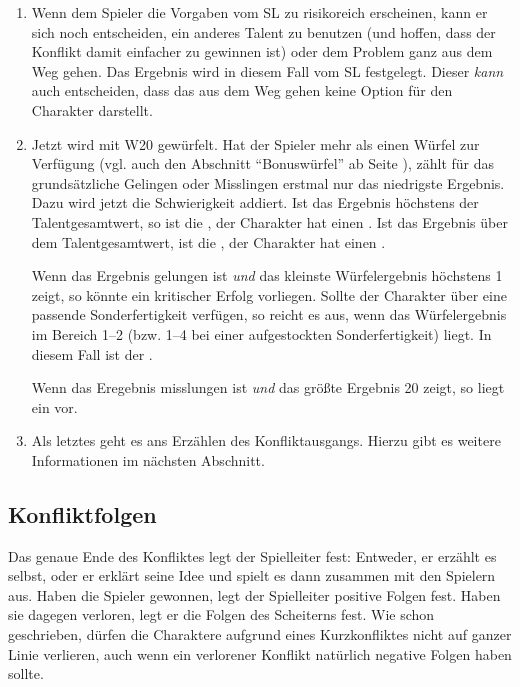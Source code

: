 \begin{enumerate}
  \item Wenn dem Spieler die Vorgaben vom SL zu risikoreich erscheinen, kann er sich noch entscheiden, ein anderes Talent zu benutzen (und hoffen, dass der Konflikt damit einfacher zu gewinnen ist) oder dem Problem ganz aus dem Weg gehen. Das Ergebnis wird in diesem Fall vom SL festgelegt. Dieser \emph{kann} auch entscheiden, dass das aus dem Weg gehen keine Option für den Charakter darstellt.
  
  \item\label{KKAbschnittWuerfeln} Jetzt wird mit W20 gewürfelt. Hat der Spieler mehr als einen Würfel zur Verfügung {(vgl. auch den Abschnitt ``Bonuswürfel'' ab Seite \pageref{Bonuswuerfel})}, zählt für das grundsätzliche Gelingen oder Misslingen erstmal nur das niedrigste Ergebnis. Dazu wird jetzt die Schwierigkeit addiert. Ist das Ergebnis höchstens der Talentgesamtwert, so ist die , der Charakter hat einen . Ist das Ergebnis über dem Talentgesamtwert, ist die , der Charakter hat einen .
  
  Wenn das Ergebnis gelungen ist \emph{und} das kleinste Würfelergebnis höchstens 1 zeigt, so könnte ein kritischer Erfolg vorliegen. Sollte der Charakter über eine passende Sonderfertigkeit verfügen, so reicht es aus, wenn das Würfelergebnis im Bereich 1--2 (bzw. 1--4 bei einer aufgestockten Sonderfertigkeit) liegt. In diesem Fall ist der .

  Wenn das Eregebnis misslungen ist \emph{und} das größte Ergebnis 20 zeigt, so liegt ein  vor.

  \item Als letztes geht es ans Erzählen des Konfliktausgangs. Hierzu gibt es weitere Informationen im nächsten Abschnitt.
\end{enumerate}

\subsection{Konfliktfolgen}
 Das genaue Ende des Konfliktes legt der Spielleiter fest: Entweder, er erzählt es selbst, oder er erklärt seine Idee und spielt es dann zusammen mit den Spielern aus. Haben die Spieler gewonnen, legt der Spielleiter positive Folgen fest. Haben sie dagegen verloren, legt er die Folgen des Scheiterns fest. Wie schon geschrieben, dürfen die Charaktere aufgrund eines Kurzkonfliktes nicht auf ganzer Linie verlieren, auch wenn ein verlorener Konflikt natürlich negative Folgen haben sollte.


